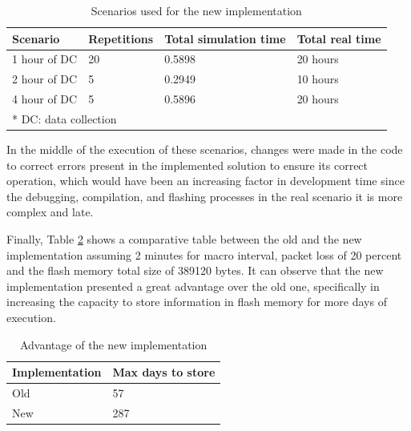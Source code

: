 \documentclass[journal]{IEEEtran}	%
\begin{document}
\begin{table}[H]
    \renewcommand{\arraystretch}{1.25}		%
    \centering
    \caption{Scenarios used for the new implementation}	%
    \label{tab:scenariosNewImpl}
    \begin{tabular}{l|l|l|l}					%
    \hline \hline
    \textbf{Scenario}        &    \textbf{Repetitions} &    \textbf{Total simulation time} &    \textbf{Total real time}\\
    \hline
    1 hour of DC      &   20   &   0.5898 &   20 hours\\
    2 hour of DC      &    5   &   0.2949 &   10 hours\\
    4 hour of DC      &    5   &   0.5896 &   20 hours\\
    \hline
    \multicolumn{4}{l}{* DC: data collection}	\\
    \hline \hline
    \end{tabular}
\end{table}

In the middle of the execution of these scenarios, changes were made in the code to correct errors present in the implemented solution to ensure its correct operation, which would have been an increasing factor in development time since the debugging, compilation, and flashing processes in the real scenario it is more complex and late.

Finally, Table \ref{tab:advantageNewImpl} shows a comparative table between the old and the new implementation assuming 2 minutes for macro interval, packet loss of 20 percent and the flash memory total size of 389120 bytes. It can observe that the new implementation presented a great advantage over the old one, specifically in increasing the capacity to store information in flash memory for more days of execution.

\begin{table}[H]
    \renewcommand{\arraystretch}{1.25}		%
    \centering
    \caption{Advantage of the new implementation}	%
    \label{tab:advantageNewImpl}
    \begin{tabular}{l|l}					%
    \hline \hline
    \textbf{Implementation}        &    \textbf{Max days to store}\\
    \hline
    Old      &   57  \\
    New      &   287  \\
    \hline \hline
    \end{tabular}
\end{table}
\end{document}
